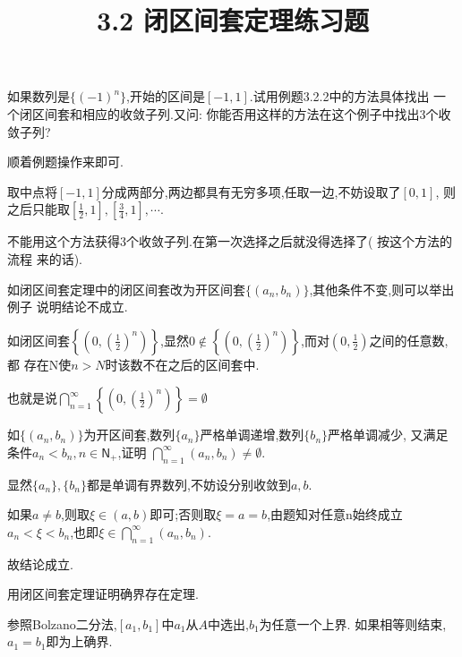 \documentclass[windows,list,answers]{BHCexam}
\begin{document}
\everymath{\displaystyle}
\title{3.2 闭区间套定理\quad 练习题}

\maketitle

\begin{questions}
    \question
    如果数列是$\{(-1)^n\}$,开始的区间是$[-1,1]$.试用例题3.2.2中的方法具体找出
    一个闭区间套和相应的收敛子列.又问: 你能否用这样的方法在这个例子中找出3个收敛子列?
    \begin{solution}{1cm}
        \methodonly
        顺着例题操作来即可.

        取中点将$[-1,1]$分成两部分,两边都具有无穷多项,任取一边,不妨设取了$[0,1]$,
        则之后只能取$[\frac{1}{2},1],[\frac{3}{4},1],\cdots$.

        不能用这个方法获得3个收敛子列.在第一次选择之后就没得选择了( 按这个方法的流程
        来的话).
    \end{solution}

    \question
    如闭区间套定理中的闭区间套改为开区间套$\{(a_n,b_n)\}$,其他条件不变,则可以举出例子
    说明结论不成立.
    \begin{solution}{1cm}
        \methodonly
        如闭区间套$\left\{(0,(\frac{1}{2})^n)\right\}$,显然$0\notin 
        \left\{(0,(\frac{1}{2})^n)\right\}$,而对$(0,\frac{1}{2})$之间的任意数,都
        存在N使$n>N$时该数不在之后的区间套中.

        也就是说$\textstyle\bigcap_{n=1}^\infty\left\{(0,(\frac{1}{2})^n)\right\}=
        \emptyset $
    \end{solution}

    \question
    如$\{(a_n,b_n)\}$为开区间套,数列$\{a_n\}$严格单调递增,数列$\{b_n\}$严格单调减少,
    又满足条件$a_n<b_n,n\in \mathsf{N}_+$,证明
    $\textstyle\bigcap_{n=1}^\infty(a_n,b_n)\neq\emptyset$.
    \begin{solution}{1cm}
        \methodonly
        显然$\{a_n\},\{b_n\}$都是单调有界数列,不妨设分别收敛到$a,b$.

        如果$a\neq b$,则取$\xi \in (a,b)$即可;否则取$\xi=a=b$,由题知对任意n始终成立
        $a_n<\xi<b_n$,也即$\xi\in\textstyle\bigcap_{n=1}^\infty(a_n,b_n)$.

        故结论成立.
    \end{solution}

    \question
    用闭区间套定理证明确界存在定理.
    \begin{solution}{1cm}
        \methodonly
        参照Bolzano二分法,$[a_1,b_1]$中$a_1$从$A$中选出,$b_1$为任意一个上界.
        如果相等则结束,$a_1=b_1$即为上确界.


\end{solution}
\end{questions}
\end{document}
